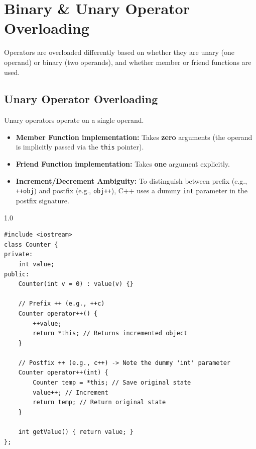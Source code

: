 \documentclass[12pt,a4paper]{article}
\begin{document}
\section{Binary \& Unary Operator Overloading}

Operators are overloaded differently based on whether they are unary (one operand) or binary (two operands), and whether member or friend functions are used.

\subsection{Unary Operator Overloading}
Unary operators operate on a single operand.
\begin{itemize}[leftmargin=*, itemsep=3pt]
  \item \textbf{Member Function implementation:} Takes \textbf{zero} arguments (the operand is implicitly passed via the \texttt{this} pointer).
  \item \textbf{Friend Function implementation:} Takes \textbf{one} argument explicitly.
  \item \textbf{Increment/Decrement Ambiguity:} To distinguish between prefix (e.g., \texttt{++obj}) and postfix (e.g., \texttt{obj++}), C++ uses a dummy \texttt{int} parameter in the postfix signature.
\end{itemize}

\begin{tcolorbox}[examplebox, title={Code Example: Prefix and Postfix operator overloading}]
\begin{spacing}{1.0}
\begin{verbatim}
#include <iostream>
class Counter {
private:
    int value;
public:
    Counter(int v = 0) : value(v) {}
    
    // Prefix ++ (e.g., ++c)
    Counter operator++() {
        ++value;
        return *this; // Returns incremented object
    }
    
    // Postfix ++ (e.g., c++) -> Note the dummy 'int' parameter
    Counter operator++(int) {
        Counter temp = *this; // Save original state
        value++; // Increment
        return temp; // Return original state
    }
    
    int getValue() { return value; }
};
\end{verbatim}
\end{spacing}
\end{tcolorbox}
\end{document}
